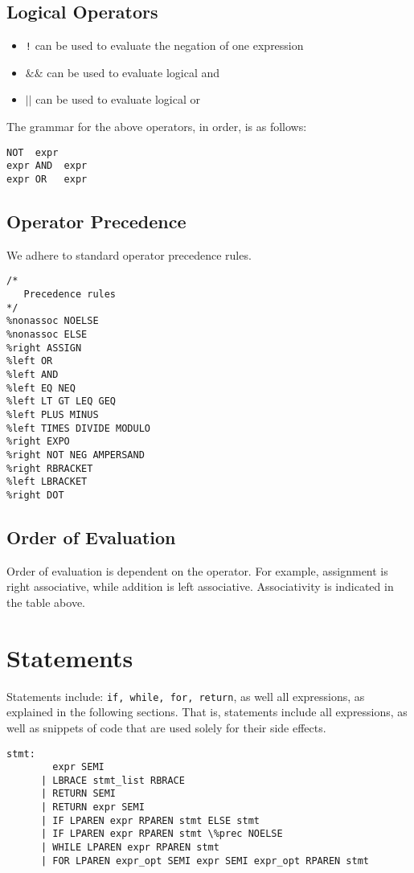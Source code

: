 \documentclass{article}
\begin{document}
\subsection{Logical Operators}
\begin{itemize}
\item \texttt{!} can be used to evaluate the negation of one expression
\item \texttt{$\&\&$} can be used to evaluate logical and
\item \texttt{$\vert\vert$} can be used to evaluate logical or
\end{itemize}

The grammar for the above operators, in order, is as follows:
\begin{Verbatim}[frame=single]
NOT  expr
expr AND  expr
expr OR   expr
\end{Verbatim}

\subsection{Operator Precedence}
We adhere to standard operator precedence rules. 


\begin{Verbatim}[frame=single]
/* 
   Precedence rules 
*/
%nonassoc NOELSE 
%nonassoc ELSE 
%right ASSIGN 
%left OR
%left AND
%left EQ NEQ
%left LT GT LEQ GEQ 
%left PLUS MINUS 
%left TIMES DIVIDE MODULO
%right EXPO
%right NOT NEG AMPERSAND
%right RBRACKET
%left LBRACKET
%right DOT
\end{Verbatim}

\subsection{Order of Evaluation}
Order of evaluation is dependent on the operator. For example, assignment is right associative, while addition is left associative. Associativity is indicated in the table above.

\section{Statements}
Statements include: \texttt{if, while, for, return}, as well all expressions, as explained in the following sections. That is, statements include all expressions, as well as snippets of code that are used solely for their side effects.

\begin{Verbatim}[frame=single]
stmt:
	    expr SEMI 					
	  | LBRACE stmt_list RBRACE				
	  | RETURN SEMI					
	  | RETURN expr SEMI				 
	  | IF LPAREN expr RPAREN stmt ELSE stmt 	     
	  | IF LPAREN expr RPAREN stmt \%prec NOELSE 	     
	  | WHILE LPAREN expr RPAREN stmt 		   
  	  | FOR LPAREN expr_opt SEMI expr SEMI expr_opt RPAREN stmt 

\end{Verbatim}
\end{document}
